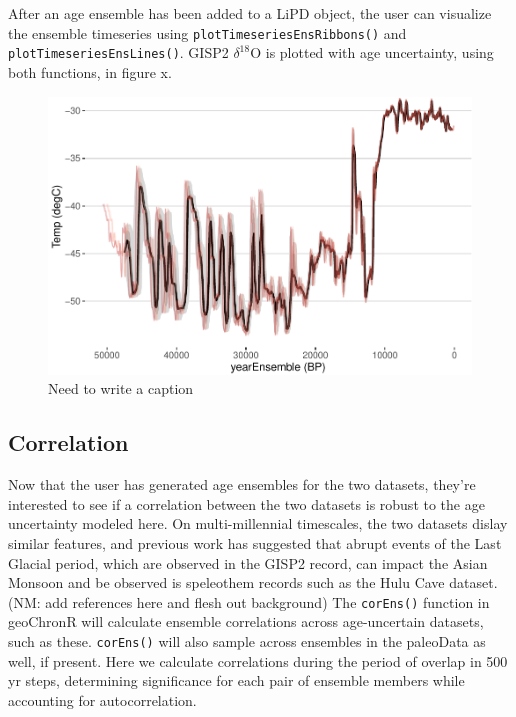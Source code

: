 \documentclass[gc, manuscript]{copernicus}
\begin{document}
After an age ensemble has been added to a LiPD object, the user can
visualize the ensemble timeseries using
\texttt{plotTimeseriesEnsRibbons()} and
\texttt{plotTimeseriesEnsLines()}. GISP2 \(\delta^{18}\)O is plotted
with age uncertainty, using both functions, in figure x.

\begin{figure}
\centering
\includegraphics{geoChronR-paper_files/figure-latex/unnamed-chunk-6-1.pdf}
\caption{\label{fig:unnamed-chunk-6}Need to write a caption}
\end{figure}

\subsection{Correlation}

Now that the user has generated age ensembles for the two datasets,
they're interested to see if a correlation between the two datasets is
robust to the age uncertainty modeled here. On multi-millennial
timescales, the two datasets dislay similar features, and previous work
has suggested that abrupt events of the Last Glacial period, which are
observed in the GISP2 record, can impact the Asian Monsoon and be
observed is speleothem records such as the Hulu Cave dataset. (NM: add
references here and flesh out background) The \texttt{corEns()} function
in geoChronR will calculate ensemble correlations across age-uncertain
datasets, such as these. \texttt{corEns()} will also sample across
ensembles in the paleoData as well, if present. Here we calculate
correlations during the period of overlap in 500 yr steps, determining
significance for each pair of ensemble members while accounting for
autocorrelation.
\end{document}

